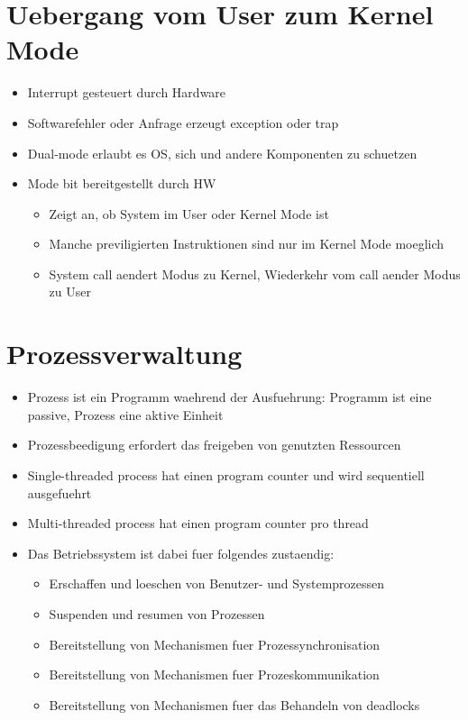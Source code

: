 \documentclass[a4paper]{scrreprt}
\begin{document}
\section{Uebergang vom User zum Kernel Mode}
\begin{itemize}
	\item Interrupt gesteuert durch Hardware
	\item Softwarefehler oder Anfrage erzeugt exception oder trap
	\item Dual-mode erlaubt es OS, sich und andere Komponenten zu schuetzen
	\item Mode bit bereitgestellt durch HW
		\begin{itemize}
			\item Zeigt an, ob System im User oder Kernel Mode ist
			\item Manche previligierten Instruktionen sind nur im Kernel Mode moeglich
			\item System call aendert Modus zu Kernel, Wiederkehr vom call aender Modus zu User
		\end{itemize}
\end{itemize}

\section{Prozessverwaltung}
\begin{itemize}
	\item Prozess ist ein Programm waehrend der Ausfuehrung: Programm ist eine passive, Prozess eine aktive Einheit
	\item Prozessbeedigung erfordert das freigeben von genutzten Ressourcen
	\item Single-threaded process hat einen program counter und wird sequentiell ausgefuehrt
	\item Multi-threaded process hat einen program counter pro thread
	\item Das Betriebssystem ist dabei fuer folgendes zustaendig:
		\begin{itemize}
			\item Erschaffen und loeschen von Benutzer- und Systemprozessen
			\item Suspenden und resumen von Prozessen
			\item Bereitstellung von Mechanismen fuer Prozessynchronisation
			\item Bereitstellung von Mechanismen fuer Prozeskommunikation
			\item Bereitstellung von Mechanismen fuer das Behandeln von deadlocks
		\end{itemize}
\end{itemize}
\end{document}
